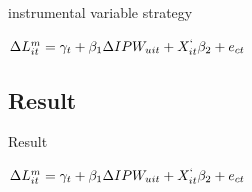 \documentclass[10pt,aspectratio=43,mathserif,table]{beamer}
\begin{document}
\begin{frame}{instrumental variable strategy}
	\begin{center}
		\Large $\Delta L^{m}_{it}=\gamma_{t} + \beta_{1} \Delta IPW_{uit} + X^{`}_{it} \beta_{2} + e_{ct}  $     

	\end{center}
\begin{figure}[thpb]
	\centering
\end{figure}
\end{frame}

\subsection{Result}
\begin{frame}{Result}
	\begin{center}
		\Large $\Delta L^{m}_{it}=\gamma_{t} + \beta_{1} \Delta IPW_{uit} + X^{`}_{it} \beta_{2} + e_{ct}  $     
		
	\end{center}
	\begin{figure}[thpb]
		\centering
	\end{figure}
\end{frame}
\end{document}
